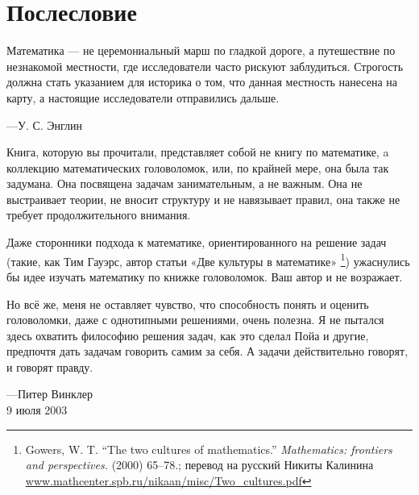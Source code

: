 \chapter*{Послесловие}

\setlength{\epigraphwidth}{.6\textwidth}
\epigraph{Математика --- не церемониальный марш по гладкой дороге, а путешествие по незнакомой местности, где исследователи часто рискуют заблудиться.
Строгость должна стать указанием для историка о том, что данная местность нанесена на карту, а настоящие исследователи отправились дальше.}{---У. С. Энглин
}

Книга, которую  вы прочитали, представляет собой не книгу по математике, a коллекцию математических головоломок, или, по крайней мере, она была так задумана.
Она посвящена задачам занимательным, а не важным.
Она не выстраивает теории, не вносит структуру и не навязывает правил, она также не требует продолжительного внимания.

Даже сторонники  подхода к математике, ориентированного на решение задач (такие, как Тим Гауэрс, автор статьи «Две культуры в математике»%
\footnote{Gowers, W. T. ``The two cultures of mathematics.'' \emph{Mathematics: frontiers and perspectives.} (2000) 65--78.; перевод на русский Никиты Калинина \href{http://www.mathcenter.spb.ru/nikaan/misc/Two_cultures.pdf}{\url{www.mathcenter.spb.ru/nikaan/misc/Two_cultures.pdf}}})
ужаснулись бы идее изучать математику по книжке головоломок.
Ваш автор и не возражает.

Но всё же, меня не оставляет чувство, что способность понять и оценить головоломки, даже с однотипными решениями, очень полезна.
Я не пытался здесь охватить  философию решения задач, как это сделал Пойа и другие, предпочтя дать задачам говорить самим за себя.
А задачи действительно говорят, и говорят правду.

\begin{flushright}
---Питер Винклер
\\
9 июля 2003
\end{flushright}
